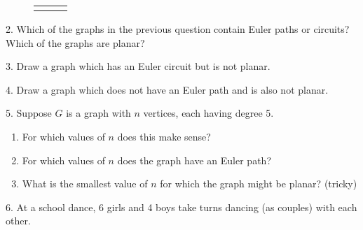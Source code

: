\documentclass[10pt,]{book}
\theoremstyle{plain}
\theoremstyle{definition}
\theoremstyle{definition}
\theoremstyle{definition}
\numberwithin{equation}{chapter}
\newlength{\panelmax}
\begin{document}
\begin{exerciselist}
{\begin{figure}
\begin{tabular}{@{}*{3}{c}@{}}
\begin{minipage}[c][\panelmax][t]{0.333333333333333\textwidth}\usebox{\panelboxDSimage}\end{minipage}&
\begin{minipage}[c][\panelmax][t]{0.333333333333333\textwidth}\usebox{\panelboxDTimage}\end{minipage}&
\begin{minipage}[c][\panelmax][t]{0.333333333333333\textwidth}\usebox{\panelboxDUimage}\end{minipage}\end{tabular}
\end{figure}
}%
\par\smallskip
\item[2.]\hypertarget{exercise-295}{}
            Which of the graphs in the previous question contain Euler paths or circuits? Which of the graphs are planar?
\par\smallskip
\item[3.]\hypertarget{exercise-296}{}
            Draw a graph which has an Euler circuit but is not planar.
\par\smallskip
\item[4.]\hypertarget{exercise-297}{}
            Draw a graph which does not have an Euler path and is also not planar.
\par\smallskip
\item[5.]\hypertarget{exercise-298}{}
            Suppose \(G\) is a graph with \(n\) vertices, each having degree 5.
\leavevmode%
\begin{enumerate}[label=(\alph*)]
\item\hypertarget{li-1241}{}
                For which values of \(n\) does this make sense?
\item\hypertarget{li-1242}{}
                For which values of \(n\) does the graph have an Euler path?
\item\hypertarget{li-1243}{}
                What is the smallest value of \(n\) for which the graph might be planar? (tricky)
\end{enumerate}
\par\smallskip
\item[6.]\hypertarget{exercise-299}{}
            At a school dance, 6 girls and 4 boys take turns dancing (as couples) with each other.
\leavevmode%
\begin{enumerate}[label=(\alph*)]

\end{enumerate}
\end{exerciselist}
\end{document}
